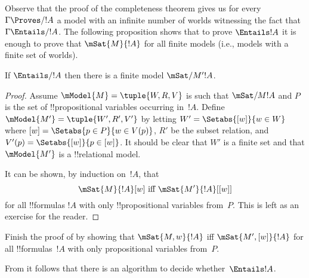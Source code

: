 \documentclass[../../../include/open-logic-section]{subfiles}
\begin{document}

Observe that the proof of the completeness theorem gives us for every
$\Gamma \Proves/ !A$ a model with an infinite number of worlds
witnessing the fact that $\Gamma \Entails/ !A$. The following
proposition shows that to prove $\Entails !A$ it is enough to prove
that $\mSat{M}{!A}$ for all finite models (i.e., models with a finite
set of worlds).

\begin{thm}
  If $\Entails/ !A$ then there is a finite model $\mSat/{M'}{!A}$.
\end{thm}

\begin{proof}
  Assume $\mModel{M}=\tuple{W, R, V}$ is such that $\mSat/{M}{!A}$ and $P$ 
  is the set of !!{propositional variable}s occurring in~$!A$. Define
  $\mModel{M'}=\tuple{W', R', V'}$ by letting $W' = \Setabs{[w]}{w \in W}$ 
  where $[w] = \Setabs{p \in P}{w \in V(p)}$, $R'$ be the subset relation, 
  and $V'(p)=\Setabs{[w]}{p \in [w]}$. It should be clear that $W'$ is a 
  finite set and that $\mModel{M'}$ is a !!{relational model}.

  It can be shown, by induction on~$!A$, that 
  \[
    \mSat{M}{!A}[w] \text{ iff } \mSat{M'}{!A}[{[w]}]
  \]
  for all !!{formula}s $!A$ with only !!{propositional variable}s
  from~$P$. This is left as an exercise for the reader.
\end{proof}

\begin{prob}
Finish the proof of  by showing
that $\mSat{M,w}{!A}$ iff $\mSat{M',[w]}{!A}$ for all !!{formula}s~$!A$
with only propositional variables from~$P$. 
\end{prob}

From  it follows that there is an algorithm to
decide whether~$\Entails !A$.
\end{document}
